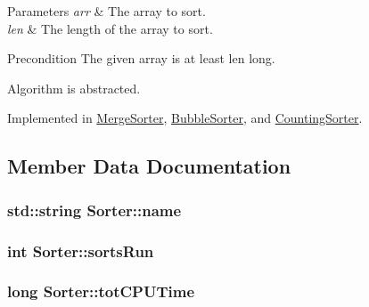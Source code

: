 \begin{DoxyParams}{Parameters}
{\em arr} & The array to sort. \\
\hline
{\em len} & The length of the array to sort. \\
\hline
\end{DoxyParams}
\begin{DoxyPrecond}{Precondition}
The given array is at least len long.
\end{DoxyPrecond}
Algorithm is abstracted. 

Implemented in \hyperlink{class_merge_sorter_a1137eeb25786449a1363bac71f81014d}{Merge\+Sorter}, \hyperlink{class_bubble_sorter_ab430d94d65daffbe7ccc9e747e05b653}{Bubble\+Sorter}, and \hyperlink{class_counting_sorter_adcfc7504df3cd6e0f398a3f064bc01bc}{Counting\+Sorter}.



\subsection{Member Data Documentation}
\subsubsection[{\texorpdfstring{name}{name}}]{\setlength{\rightskip}{0pt plus 5cm}std\+::string Sorter\+::name\hspace{0.3cm}{\ttfamily [protected]}}\hypertarget{class_sorter_ae86338aba4991d9a1376400733579f4f}{}\label{class_sorter_ae86338aba4991d9a1376400733579f4f}
\subsubsection[{\texorpdfstring{sorts\+Run}{sortsRun}}]{\setlength{\rightskip}{0pt plus 5cm}int Sorter\+::sorts\+Run\hspace{0.3cm}{\ttfamily [protected]}}\hypertarget{class_sorter_a582afc82309a3bf0e5567814b6d61079}{}\label{class_sorter_a582afc82309a3bf0e5567814b6d61079}
\subsubsection[{\texorpdfstring{tot\+C\+P\+U\+Time}{totCPUTime}}]{\setlength{\rightskip}{0pt plus 5cm}long Sorter\+::tot\+C\+P\+U\+Time\hspace{0.3cm}{\ttfamily [protected]}}\hypertarget{class_sorter_a695f5c4f7455145e9e8574fa5ee39fc4}{}\label{class_sorter_a695f5c4f7455145e9e8574fa5ee39fc4}
